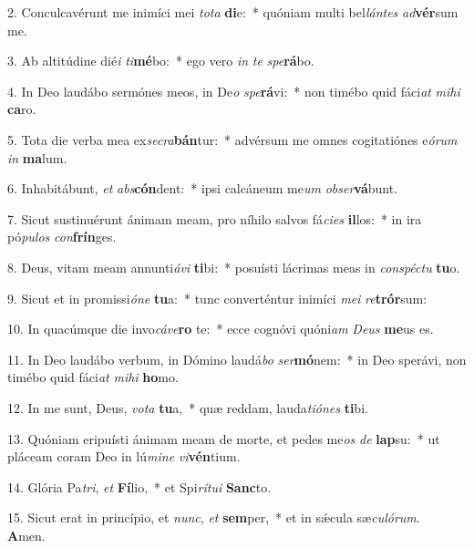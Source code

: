 2. Conculcavérunt me inimíci mei \textit{to}\textit{ta} \textbf{di}e:~*  quóniam multi bel\textit{lán}\textit{tes} \textit{ad}\textbf{vér}sum me.\

3. Ab altitúdine dié\textit{i} \textit{ti}\textbf{mé}bo:~*  ego vero \textit{in} \textit{te} \textit{spe}\textbf{rá}bo.\

4. In Deo laudábo sermónes meos, in De\textit{o} \textit{spe}\textbf{rá}vi:~*  non timébo quid fáci\textit{at} \textit{mi}\textit{hi} \textbf{ca}ro.\

5. Tota die verba mea ex\textit{se}\textit{cra}\textbf{bán}tur:~*  advérsum me omnes cogitatiónes e\textit{ó}\textit{rum} \textit{in} \textbf{ma}lum.\

6. Inhabitábunt, \textit{et} \textit{abs}\textbf{cón}dent:~*  ipsi calcáneum me\textit{um} \textit{ob}\textit{ser}\textbf{vá}bunt.\

7. Sicut sustinuérunt ánimam meam, pro níhilo salvos fá\textit{ci}\textit{es} \textbf{il}los:~*  in ira pó\textit{pu}\textit{los} \textit{con}\textbf{frín}ges.\

8. Deus, vitam meam annunti\textit{á}\textit{vi} \textbf{ti}bi:~*  posuísti lácrimas meas in \textit{con}\textit{spéc}\textit{tu} \textbf{tu}o.\

9. Sicut et in promissi\textit{ó}\textit{ne} \textbf{tu}a:~*  tunc converténtur inimíci \textit{me}\textit{i} \textit{re}\textbf{trór}sum:\

10. In quacúmque die invo\textit{cá}\textit{ve}\textbf{ro} te:~*  ecce cognóvi quóni\textit{am} \textit{De}\textit{us} \textbf{me}us es.\

11. In Deo laudábo verbum, in Dómino laudá\textit{bo} \textit{ser}\textbf{mó}nem:~*  in Deo sperávi, non timébo quid fáci\textit{at} \textit{mi}\textit{hi} \textbf{ho}mo.\

12. In me sunt, Deus, \textit{vo}\textit{ta} \textbf{tu}a,~*  quæ reddam, lauda\textit{ti}\textit{ó}\textit{nes} \textbf{ti}bi.\

13. Quóniam eripuísti ánimam meam de morte, et pedes me\textit{os} \textit{de} \textbf{lap}su:~*  ut pláceam coram Deo in lú\textit{mi}\textit{ne} \textit{vi}\textbf{vén}tium.\

14. Glória Pa\textit{tri}, \textit{et} \textbf{Fí}lio,~*  et Spi\textit{rí}\textit{tu}\textit{i} \textbf{Sanc}to.\

15. Sicut erat in princípio, et \textit{nunc}, \textit{et} \textbf{sem}per,~*  et in sǽcula sæ\textit{cu}\textit{ló}\textit{rum}. \textbf{A}men.\

